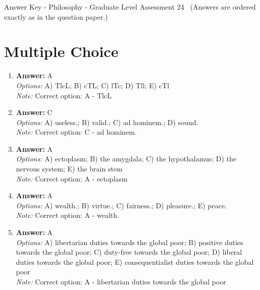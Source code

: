 \documentclass[12pt]{article}
\begin{document}
\begin{center}
Answer Key - Philosophy - Graduate Level Assessment 24 \
\small (Answers are ordered exactly as in the question paper.)
\end{center}

\section*{Multiple Choice}
\begin{enumerate}[label=\arabic*.]
\item \textbf{Answer:} A
\\ \textit{Options:} A) TlcL; B) cTL; C) lTc; D) Tll; E) cTl
\\ \textit{Note:} Correct option: A - TlcL
\item \textbf{Answer:} C
\\ \textit{Options:} A) useless.; B) valid.; C) ad hominem.; D) sound.
\\ \textit{Note:} Correct option: C - ad hominem.
\item \textbf{Answer:} A
\\ \textit{Options:} A) ectoplasm; B) the amygdala; C) the hypothalamus; D) the nervous system; E) the brain stem
\\ \textit{Note:} Correct option: A - ectoplasm
\item \textbf{Answer:} A
\\ \textit{Options:} A) wealth.; B) virtue.; C) fairness.; D) pleasure.; E) peace.
\\ \textit{Note:} Correct option: A - wealth.
\item \textbf{Answer:} A
\\ \textit{Options:} A) libertarian duties towards the global poor; B) positive duties towards the global poor; C) duty-free towards the global poor; D) liberal duties towards the global poor; E) consequentialist duties towards the global poor
\\ \textit{Note:} Correct option: A - libertarian duties towards the global poor
\end{enumerate}
\end{document}
